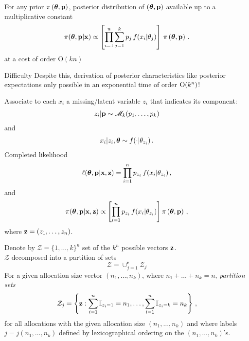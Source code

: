 \begin{slide}
For any prior $\pi\left(\mbox{\boldmath{$\theta$}},\mathbf{p}\right)$, posterior
distribution of $(\mbox{\boldmath{$\theta$}},\mathbf{p})$ available up to a multiplicative constant
\small$$
\pi(\mbox{\boldmath{$\theta$}},\mathbf{p}|\mathbf{x}) \propto \left[\prod_{i=1}^n \sum_{j=1}^k p_j\,f(x_i|\theta_j)\right] 
	\,\pi\left(\mbox{\boldmath{$\theta$}},\mathbf{p}\right)\,.
$$\normalsize
at a cost of order $\text{O}(kn)$

\vs\pause
\begin{block}{Difficulty}
Despite this, derivation of posterior characteristics like posterior expectations
only possible in an exponential time of order $\hbox{O}(k^n)$!
\end{block}

\end{slide}\begin{slide}

Associate to each $x_i$ a missing/latent variable $z_i$ that indicates its component:
$$
z_i|\mathbf{p}\sim\mathscr{M}_k(p_1,\allowbreak\ldots,\allowbreak p_k)
$$
and
$$
x_i|z_i,\mbox{\boldmath{$\theta$}} \sim f(\cdot|\theta_{z_i})\,.
$$
\pause
Completed likelihood 
\small$$
\ell(\mbox{\boldmath{$\theta$}},\mathbf{p}|\mathbf{x},{\bf z})=\prod_{i=1}^n p_{z_i}\,f(x_i|\theta_{z_i})\,,
$$
and
$$
\pi(\mbox{\boldmath{$\theta$}},\mathbf{p}|\mathbf{x},{\bf z}) \propto \left[\prod_{i=1}^n p_{z_i}\,f(x_i|\theta_{z_i})\right] 
\pi\left(\mbox{\boldmath{$\theta$}},\mathbf{p}\right)\,,
$$
\normalsize where ${\bf z}=(z_1,\ldots,z_n)$.

\end{slide}\begin{slide}

Denote by $\mathcal{Z}=\{1,\ldots,k\}^n$
set of the $k^n$ possible vectors ${\bf z}$.\\
$\mathcal{Z}$ decomposed into a partition of sets
$$
\displaystyle \mathcal{Z}=\cup_{j=1}^\mathfrak{r} \mathcal{Z}_j
$$
For a given allocation size vector
$\left(n_1,\ldots,n_k\right)$, where $n_1+\ldots+n_k=n$, 
{\em partition sets}
\small$$
\mathcal{Z}_j = \left\{{\bf z}:\sum_{i=1}^n\mathbb{I}_{z_i=1}=n_1,
\ldots,\sum_{i=1}^n\mathbb{I}_{z_i=k}=n_k\right\}\,,
$$\normalsize
for all allocations with the given allocation size $\left(n_1,\ldots,n_k\right)$ 
and where labels $j=j(n_1,\ldots,n_k)$ defined by lexicographical ordering on the
$\left(n_1,\ldots,n_k\right)$'s.\\
%
\end{slide}\begin{slide}


\end{slide}

